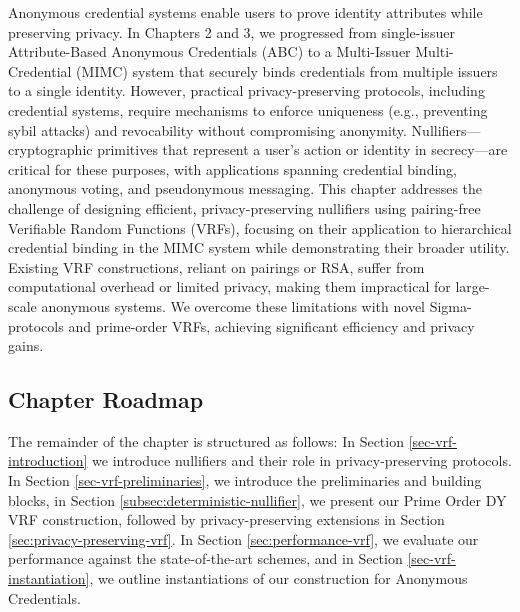 \label{chap4}
Anonymous credential systems enable users to prove identity attributes while preserving privacy. In Chapters 2 and 3, we progressed from single-issuer Attribute-Based Anonymous Credentials (ABC) to a Multi-Issuer Multi-Credential (MIMC) system that securely binds credentials from multiple issuers to a single identity. However, practical privacy-preserving protocols, including credential systems, require mechanisms to enforce uniqueness (e.g., preventing sybil attacks) and revocability without compromising anonymity. Nullifiers—cryptographic primitives that represent a user’s action or identity in secrecy—are critical for these purposes, with applications spanning credential binding, anonymous voting, and pseudonymous messaging. This chapter addresses the challenge of designing efficient, privacy-preserving nullifiers using pairing-free Verifiable Random Functions (VRFs), focusing on their application to hierarchical credential binding in the MIMC system while demonstrating their broader utility. Existing VRF constructions, reliant on pairings or RSA, suffer from computational overhead or limited privacy, making them impractical for large-scale anonymous systems. We overcome these limitations with novel Sigma-protocols and prime-order VRFs, achieving significant efficiency and privacy gains.

\subsection*{Chapter Roadmap}
The remainder of the chapter is structured as follows: In Section \ref{sec-vrf-introduction} we introduce nullifiers and their role in privacy-preserving protocols. In Section \ref{sec-vrf-preliminaries}, we introduce the preliminaries and building blocks, in Section \ref{subsec:deterministic-nullifier}, we present our Prime Order DY VRF construction, followed by privacy-preserving extensions in Section \ref{sec:privacy-preserving-vrf}. In Section \ref{sec:performance-vrf}, we evaluate our performance against the state-of-the-art schemes, and in Section \ref{sec-vrf-instantiation}, we outline instantiations of our construction for Anonymous Credentials. 


